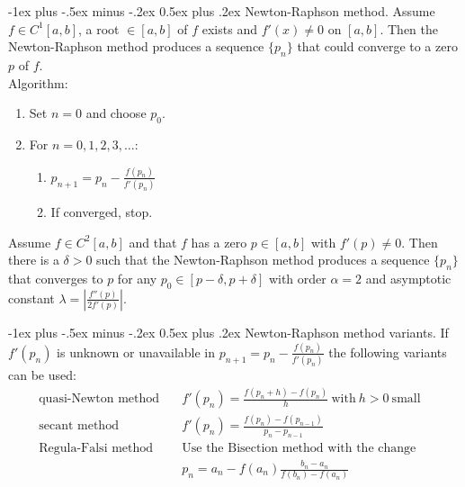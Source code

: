 \documentclass[10pt,landscape,a4paper]{article}
\makeatletter
\renewcommand{\section}{\@startsection{section}{1}{0mm}%
	{-1ex plus -.5ex minus -.2ex}%
	{0.5ex plus .2ex}%
	{\normalfont\large\bfseries}}
\makeatother
\begin{document}
\begin{multicols}{3}
		\section{Newton-Raphson method.}
		Assume $ f\in C^1[a,b] $, a root $ \in[a,b] $ of $ f $ exists and $ f'(x)\neq0 $ on $ [a,b] $.
		Then the Newton-Raphson method produces a sequence $ \{p_n\} $ that could converge to a zero $ p $ of $ f $.\\
		Algorithm:
			\begin{enumerate}
				\item Set $ n=0 $ and choose $ p_0 $.
				\item For $ n=0,1,2,3,\hdots $:
					\begin{enumerate}
						\item $ p_{n+1}=p_n-\frac{f(p_n)}{f'(p_n)} $
						\item If converged, stop.
					\end{enumerate}
			\end{enumerate}
		Assume $ f\in C^2[a,b] $ and that $ f $ has a zero $ p\in[a,b] $ with $ f'(p)\neq0 $.
		Then there is a $ \delta>0 $ such that the Newton-Raphson method produces a sequence $ \{p_n\} $ that converges to $ p $ for any $ p_0\in[p-\delta,p+\delta] $ with order $ \alpha=2 $ and asymptotic constant $ \lambda=\left|\frac{f''(p)}{2f'(p)}\right| $.
		
		\section{Newton-Raphson method variants.}
		If $ f'(p_n) $ is unknown or unavailable in $ p_{n+1}=p_n-\frac{f(p_n)}{f'(p_n)} $ the following variants can be used:
			\begin{align*}
				\text{quasi-Newton method} \quad &f'(p_n)=\frac{f(p_n+h)-f(p_n)}{h} \ \text{with} \ h>0 \ \text{small}&\\
				\text{secant method} \quad &f'(p_n)=\frac{f(p_n)-f(p_{n-1})}{p_n-p_{n-1}}&\\
				\text{Regula-Falsi method} \quad &\text{Use the Bisection method with the change}&\\
				&p_n=a_n-f(a_n)\frac{b_n-a_n}{f(b_n)-f(a_n)}&
			\end{align*}
		

\end{multicols}
\end{document}
